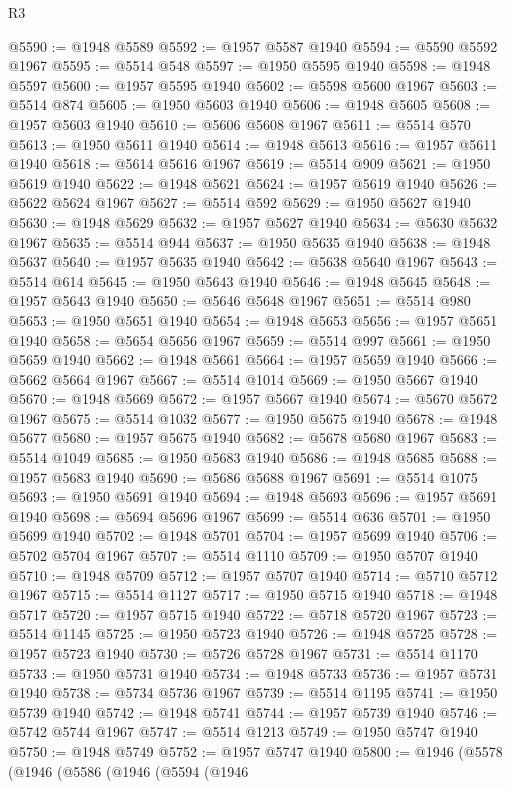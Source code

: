 \begin{lexlean}{R3}
\begin{coremodule}
@5590 := @1948 @5589
@5592 := @1957 @5587 @1940
@5594 := @5590 @5592 @1967
@5595 := @5514 @548
@5597 := @1950 @5595 @1940
@5598 := @1948 @5597
@5600 := @1957 @5595 @1940
@5602 := @5598 @5600 @1967
@5603 := @5514 @874
@5605 := @1950 @5603 @1940
@5606 := @1948 @5605
@5608 := @1957 @5603 @1940
@5610 := @5606 @5608 @1967
@5611 := @5514 @570
@5613 := @1950 @5611 @1940
@5614 := @1948 @5613
@5616 := @1957 @5611 @1940
@5618 := @5614 @5616 @1967
@5619 := @5514 @909
@5621 := @1950 @5619 @1940
@5622 := @1948 @5621
@5624 := @1957 @5619 @1940
@5626 := @5622 @5624 @1967
@5627 := @5514 @592
@5629 := @1950 @5627 @1940
@5630 := @1948 @5629
@5632 := @1957 @5627 @1940
@5634 := @5630 @5632 @1967
@5635 := @5514 @944
@5637 := @1950 @5635 @1940
@5638 := @1948 @5637
@5640 := @1957 @5635 @1940
@5642 := @5638 @5640 @1967
@5643 := @5514 @614
@5645 := @1950 @5643 @1940
@5646 := @1948 @5645
@5648 := @1957 @5643 @1940
@5650 := @5646 @5648 @1967
@5651 := @5514 @980
@5653 := @1950 @5651 @1940
@5654 := @1948 @5653
@5656 := @1957 @5651 @1940
@5658 := @5654 @5656 @1967
@5659 := @5514 @997
@5661 := @1950 @5659 @1940
@5662 := @1948 @5661
@5664 := @1957 @5659 @1940
@5666 := @5662 @5664 @1967
@5667 := @5514 @1014
@5669 := @1950 @5667 @1940
@5670 := @1948 @5669
@5672 := @1957 @5667 @1940
@5674 := @5670 @5672 @1967
@5675 := @5514 @1032
@5677 := @1950 @5675 @1940
@5678 := @1948 @5677
@5680 := @1957 @5675 @1940
@5682 := @5678 @5680 @1967
@5683 := @5514 @1049
@5685 := @1950 @5683 @1940
@5686 := @1948 @5685
@5688 := @1957 @5683 @1940
@5690 := @5686 @5688 @1967
@5691 := @5514 @1075
@5693 := @1950 @5691 @1940
@5694 := @1948 @5693
@5696 := @1957 @5691 @1940
@5698 := @5694 @5696 @1967
@5699 := @5514 @636
@5701 := @1950 @5699 @1940
@5702 := @1948 @5701
@5704 := @1957 @5699 @1940
@5706 := @5702 @5704 @1967
@5707 := @5514 @1110
@5709 := @1950 @5707 @1940
@5710 := @1948 @5709
@5712 := @1957 @5707 @1940
@5714 := @5710 @5712 @1967
@5715 := @5514 @1127
@5717 := @1950 @5715 @1940
@5718 := @1948 @5717
@5720 := @1957 @5715 @1940
@5722 := @5718 @5720 @1967
@5723 := @5514 @1145
@5725 := @1950 @5723 @1940
@5726 := @1948 @5725
@5728 := @1957 @5723 @1940
@5730 := @5726 @5728 @1967
@5731 := @5514 @1170
@5733 := @1950 @5731 @1940
@5734 := @1948 @5733
@5736 := @1957 @5731 @1940
@5738 := @5734 @5736 @1967
@5739 := @5514 @1195
@5741 := @1950 @5739 @1940
@5742 := @1948 @5741
@5744 := @1957 @5739 @1940
@5746 := @5742 @5744 @1967
@5747 := @5514 @1213
@5749 := @1950 @5747 @1940
@5750 := @1948 @5749
@5752 := @1957 @5747 @1940
@5800 := @1946
    (@5578
      (@1946
        (@5586
          (@1946
            (@5594
              (@1946

\end{coremodule}
\end{lexlean}
